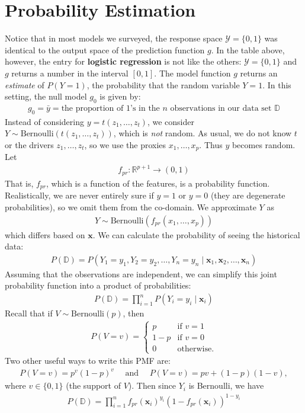 \documentclass[12pt, a4paper]{article}
\theoremstyle{definition}
\begin{document}
	\section*{Probability Estimation}
	Notice that in most models we surveyed, the response space $\mathcal{Y}=\{0,1\}$ was identical
	to the output space of the prediction function $g$. In the table above, however,
	the entry for \textbf{logistic regression} is not like the others: $\mathcal{Y}=\{0,1\}$
	and $g$ returns a number in the interval $[0,1]$. The model function $g$ returns an
	\textit{estimate} of $P(Y=1)$, the probability that the random variable $Y=1$. In this setting,
	the null model $g_0$ is given by:
	\begin{align*}
		g_0 = \bar{y} = \text{the proportion of $1$'s in the $n$ observations
			in our data set $\mathbb{D}$}
	\end{align*}
	Instead of considering $y=t(z_1,\ldots,z_t)$, we consider
	$Y\sim \text{Bernoulli}(t(z_1,\ldots,z_t))$, which is \textit{not} random.
	As usual, we do not know $t$ or the drivers $z_1,\ldots,z_t$, so we use the proxies
	$x_1,\ldots,x_p$. Thus $y$ becomes random. Let
	\begin{align*}
		f_{pr}:\mathbb{R}^{p+1}\to (0, 1)
	\end{align*}
	That is, $f_{pr}$, which is a function of the features, is a probability function.
	Realistically, we are never entirely sure if $y=1$ or $y=0$ (they are degenerate probabilities),
	so we omit them from the co-domain. We approximate $Y$ as
	\begin{align*}
		Y \sim \text{Bernoulli}(f_{pr}(x_1,\ldots,x_p))
	\end{align*}
	which differs based on $\bm{x}$. We can calculate the probability of seeing the historical
	data:
	\begin{align*}
		P(\mathbb{D}) = P(Y_1=y_1, Y_2=y_2,\ldots,Y_n=y_n\mid \bm{x}_1,\bm{x}_2,\ldots,\bm{x}_n)
	\end{align*}
	Assuming that the observations are independent, we can simplify this joint
	probability function into a product of probabilities:
	\begin{align*}
		P(\mathbb{D}) = \prod_{i=1}^{n}P(Y_i=y_i \mid \bm{x}_i)
	\end{align*}
	Recall that if $V\sim \text{Bernoulli}(p)$, then
	\begin{align*}
		P(V = v) = \begin{cases}
			p & \text{if } v = 1\\
			1-  p & \text{if } v = 0\\
			0 & \text{otherwise.}
		\end{cases}
	\end{align*}
	Two other useful ways to write this PMF are:
	\begin{align*}
		P(V=v) = p^v(1-p)^v\quad \text{ and } \quad P(V=v) = pv + (1 - p)(1-v),
	\end{align*}
	where $v\in \{0, 1\}$ (the support of $V$). Then since $Y_i$ is Bernoulli, we have
	\begin{align*}
		P(\mathbb{D}) = \prod_{i=1}^{n}f_{pr}(\bm{x}_i)^{y_i}(1 - f_{pr}(\bm{x}_i))^{1-y_i}
	\end{align*}
\end{document}
